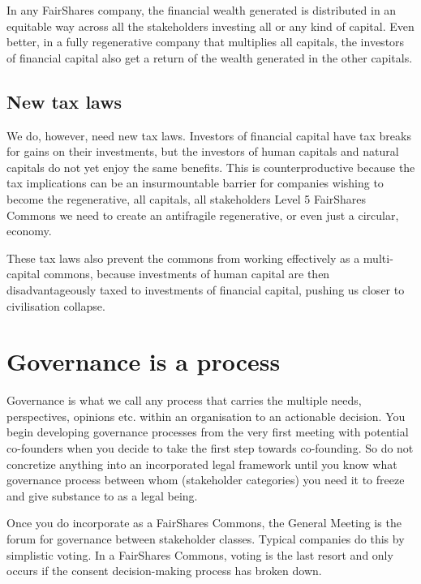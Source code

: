 In any FairShares company, the financial wealth generated is distributed in an equitable way across all the stakeholders investing all or any kind of capital. Even better, in a fully regenerative company that multiplies all capitals, the investors of financial capital also get a return of the wealth generated in the other capitals.


\subsection{New tax laws}
We do, however, need new tax laws. Investors of financial capital have tax breaks for gains on their investments, but the investors of human capitals and natural capitals do not yet enjoy the same benefits. This is counterproductive because the tax implications can be an insurmountable barrier for companies wishing to become the regenerative, all capitals, all stakeholders Level 5 FairShares Commons we need to create an antifragile regenerative, or even just a circular, economy. 


These tax laws also prevent the commons from working effectively as a multi-capital commons, because investments of human capital are then disadvantageously taxed to investments of financial capital, pushing us closer to civilisation collapse. 






\section{Governance is a process}
 
Governance is what we call any process that carries the multiple needs, perspectives, opinions etc. within an organisation to an actionable decision. You begin developing governance processes from the very first meeting with potential co-founders when you decide to take the first step towards co-founding. So do not concretize anything into an incorporated legal framework until you know what governance process between whom (stakeholder categories) you need it to freeze and give substance to as a legal being.


Once you do incorporate as a FairShares Commons, the General Meeting is the forum for governance between stakeholder classes. Typical companies do this by simplistic voting. In a FairShares Commons, voting is the last resort and only occurs if the consent decision-making process has broken down.


